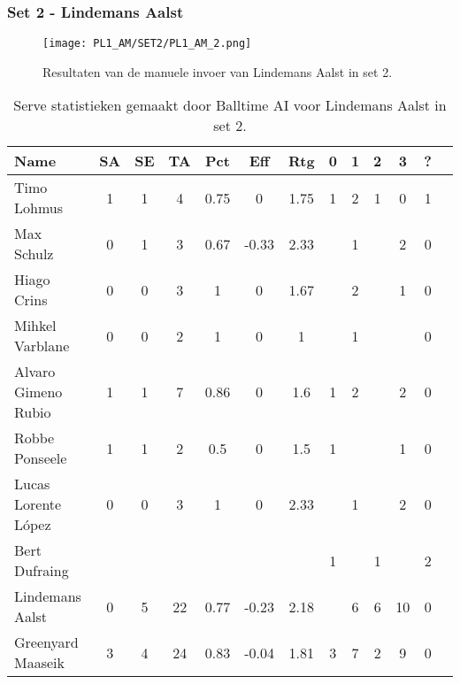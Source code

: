 \subsubsection{Set 2 - Lindemans Aalst}
\label{sec:PL1_Aalst2}
\begin{figure}
  \centering
  \texttt{[image: PL1\_AM/SET2/PL1\_AM\_2.png]}
  \caption{\label{fig:PL1_AM_2}Resultaten van de manuele invoer van Lindemans Aalst in set 2.}
\end{figure}

\begin{table}[ht!]
  \centering
  \scriptsize
  \begin{tabular}{|l|c|c|c|c|c|c|c|c|c|c|c|c|} \hline
    \textbf{Name} & SA & SE & TA & Pct & Eff & Rtg & 0 & 1 & 2 & 3 & ? \\ \hline
    Timo Lohmus & 1 & 1 & 4 & 0.75 & 0 & 1.75 & 1 & 2 & 1 & 0 & 1 \\
    Max Schulz & 0 & 1 & 3 & 0.67 & -0.33 & 2.33 &  & 1 &  & 2 & 0 \\
    Hiago Crins & 0 & 0 & 3 & 1 & 0 & 1.67 &  & 2 &  & 1 & 0 \\
    Mihkel Varblane & 0 & 0 & 2 & 1 & 0 & 1 &  & 1 &  &  & 0 \\
    Alvaro Gimeno Rubio & 1 & 1 & 7 & 0.86 & 0 & 1.6 & 1 & 2 &  & 2 & 0 \\
    Robbe Ponseele & 1 & 1 & 2 & 0.5 & 0 & 1.5 & 1 &  &  & 1 & 0 \\
    Lucas Lorente López & 0 & 0 & 3 & 1 & 0 & 2.33 &  & 1 &  & 2 & 0 \\
    Bert Dufraing &  &  &  &  &  &  & 1 &  & 1 &  & 2 \\
    Lindemans Aalst & 0 & 5 & 22 & 0.77 & -0.23 & 2.18 &  & 6 & 6 & 10 & 0 \\
    Greenyard Maaseik & 3 & 4 & 24 & 0.83 & -0.04 & 1.81 & 3 & 7 & 2 & 9 & 0 \\ \hline
  \end{tabular}
  \caption[Serve statistieken gemaakt door Balltime AI voor Lindemans Aalst in set 2]{\label{tab:PL1ServeAalst2}Serve statistieken gemaakt door Balltime AI voor Lindemans Aalst in set 2.}
\end{table}

